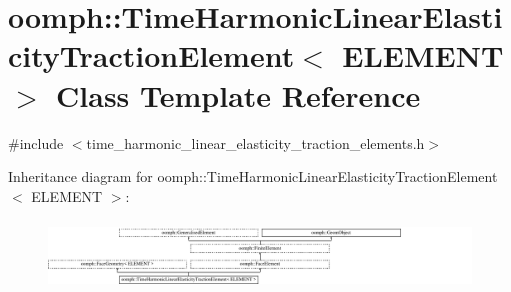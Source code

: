 \hypertarget{classoomph_1_1TimeHarmonicLinearElasticityTractionElement}{}\section{oomph\+:\+:Time\+Harmonic\+Linear\+Elasticity\+Traction\+Element$<$ E\+L\+E\+M\+E\+NT $>$ Class Template Reference}
\label{classoomph_1_1TimeHarmonicLinearElasticityTractionElement}


{\ttfamily \#include $<$time\+\_\+harmonic\+\_\+linear\+\_\+elasticity\+\_\+traction\+\_\+elements.\+h$>$}

Inheritance diagram for oomph\+:\+:Time\+Harmonic\+Linear\+Elasticity\+Traction\+Element$<$ E\+L\+E\+M\+E\+NT $>$\+:\begin{figure}[H]
\begin{center}
\leavevmode
\includegraphics[height=1.862012cm]{classoomph_1_1TimeHarmonicLinearElasticityTractionElement}
\end{center}
\end{figure}
